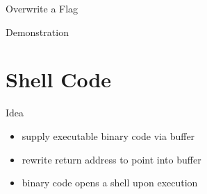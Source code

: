 \documentclass[beamer]{uibk}
\begin{document}
\begin{frame}{Overwrite a Flag}
    \begin{center}
        \huge Demonstration
    \end{center}
\end{frame}

\section{Shell Code}

\begin{frame}{Idea}
    \begin{itemize}
        \item supply executable binary code via buffer
        \medskip
        \item rewrite return address to point into buffer
        \medskip
        \item binary code opens a shell upon execution
    \end{itemize}
\end{frame}
\end{document}
